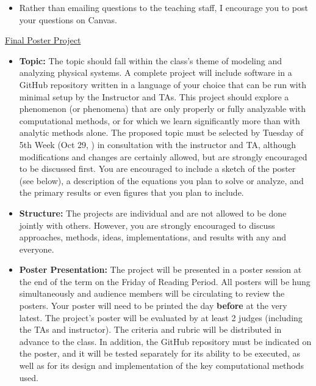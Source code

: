 \begin{itemize}

  \item Rather than emailing questions to the teaching staff, I encourage you to post your questions on Canvas. 


  
\end{itemize}  


\noindent \underline{Final Poster Project}

\begin{itemize}

  \item \textbf{Topic:} The topic should fall within the class's theme of modeling and analyzing physical systems. A complete project will include software in a GitHub repository written in a language of your choice that can be run with minimal setup by the Instructor and TAs. This project should explore a phenomenon (or phenomena) that are only properly or fully analyzable with computational methods, or for which we learn significantly more than with analytic methods alone. The proposed topic must be selected by Tuesday of 5th Week (Oct 29, \CourseYear) in consultation with the instructor and TA, although modifications and changes are certainly allowed, but are strongly encouraged to be discussed first. You are encouraged to include a sketch of the poster (see below), a description of the equations you plan to solve or analyze, and the primary results or even figures that you plan to include.

  \item \textbf{Structure:} The projects are individual and are not allowed to be done jointly with others. However, you are strongly encouraged to discuss approaches, methods, ideas, implementations, and results with any and everyone.

  \item \textbf{Poster Presentation:} The project will be presented in a poster session at the end of the term on the Friday of Reading Period. All posters will be hung simultaneously and audience members will be circulating to review the posters. Your poster will need to be printed the day \textbf{before} at the very latest. The project's poster will be evaluated by at least 2 judges (including the TAs and instructor). The criteria and rubric will be distributed in advance to the class. In addition, the GitHub repository must be indicated on the poster, and it will be tested separately for its ability to be executed, as well as for its design and implementation of the key computational methods used. 
  
\end{itemize}  


